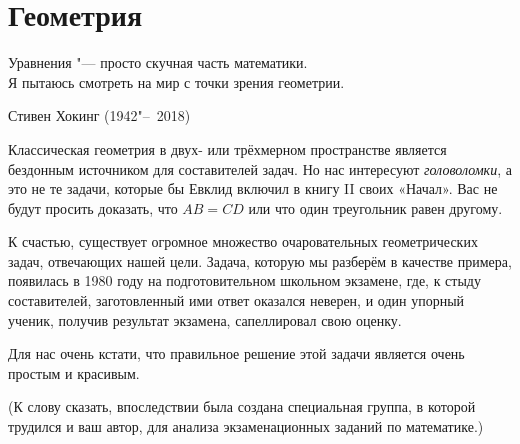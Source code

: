 \documentclass[twoside]{book}
\begin{document}




\chapter{Геометрия}

\thispagestyle{empty}

\setlength{\epigraphwidth}{.66\textwidth}
\epigraph{Уравнения "--- просто скучная часть математики.\\
Я пытаюсь смотреть на мир с точки зрения геометрии.\vspace{1ex}}{Стивен Хокинг (1942"--~2018)}

Классическая геометрия в двух- или трёхмерном пространстве является бездонным источником для составителей задач. 
Но нас интересуют \emph{головоломки}, а это не те задачи, которые бы Евклид включил в книгу II своих «Начал».
Вас не будут просить доказать, что $AB=CD$ или что один треугольник равен другому.

К счастью, существует огромное множество очаровательных геометрических задач, отвечающих нашей цели. 
Задача, которую мы разберём в качестве примера, появилась в 1980 году на подготовительном  школьном экзамене, %
где, к стыду составителей, %
заготовленный ими ответ оказался неверен,
и один упорный ученик, получив результат экзамена, сапеллировал свою оценку.

Для нас очень кстати, что правильное решение этой задачи является
очень простым и красивым.

(К слову сказать, впоследствии была создана специальная группа, в которой  трудился и ваш автор, для анализа экзаменационных заданий по математике.)
\end{document}
